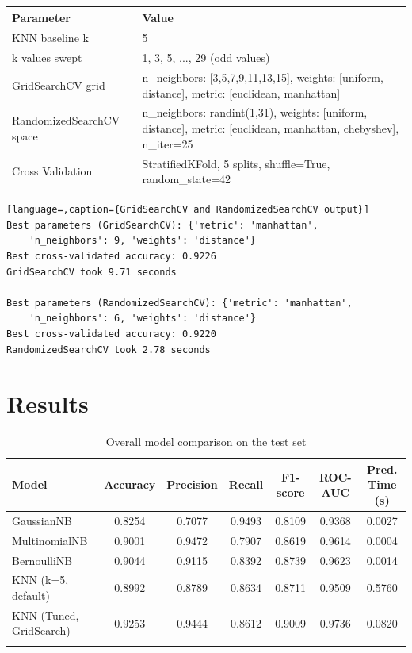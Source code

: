 \documentclass[12pt,a4paper]{article}
\begin{document}
\begin{tabular}{|p{4.2cm}|p{9.5cm}|}
\hline
Parameter & Value\\
\hline
KNN baseline k & 5 \\
\hline
k values swept & 1, 3, 5, ..., 29 (odd values) \\
\hline
GridSearchCV grid & n\_neighbors: [3,5,7,9,11,13,15], weights: [uniform, distance], metric: [euclidean, manhattan] \\
\hline
RandomizedSearchCV space & n\_neighbors: randint(1,31), weights: [uniform, distance], metric: [euclidean, manhattan, chebyshev], n\_iter=25 \\
\hline
Cross Validation & StratifiedKFold, 5 splits, shuffle=True, random\_state=42 \\
\hline
\end{tabular}

\begin{lstlisting}[language=,caption={GridSearchCV and RandomizedSearchCV output}]
Best parameters (GridSearchCV): {'metric': 'manhattan',
    'n_neighbors': 9, 'weights': 'distance'}
Best cross-validated accuracy: 0.9226
GridSearchCV took 9.71 seconds

Best parameters (RandomizedSearchCV): {'metric': 'manhattan',
    'n_neighbors': 6, 'weights': 'distance'}
Best cross-validated accuracy: 0.9220
RandomizedSearchCV took 2.78 seconds
\end{lstlisting}

\section{Results}

{\small
\begin{longtable}{p{3.1cm}cccccc}
\toprule
Model & Accuracy & Precision & Recall & F1-score & ROC-AUC & Pred. Time (s)\\
\midrule
GaussianNB & 0.8254 & 0.7077 & 0.9493 & 0.8109 & 0.9368 & 0.0027 \\
MultinomialNB & 0.9001 & 0.9472 & 0.7907 & 0.8619 & 0.9614 & 0.0004 \\
BernoulliNB & 0.9044 & 0.9115 & 0.8392 & 0.8739 & 0.9623 & 0.0014 \\
KNN (k=5, default) & 0.8992 & 0.8789 & 0.8634 & 0.8711 & 0.9509 & 0.5760 \\
KNN (Tuned, GridSearch) & 0.9253 & 0.9444 & 0.8612 & 0.9009 & 0.9736 & 0.0820 \\
\bottomrule
\caption{Overall model comparison on the test set}
\end{longtable}
}
\end{document}
